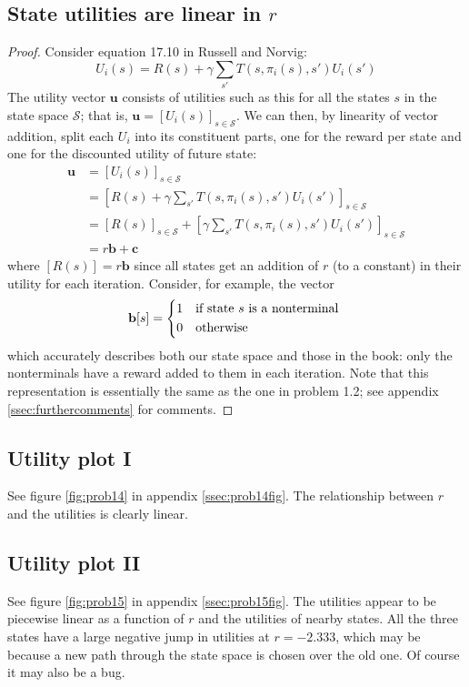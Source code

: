 \documentclass[letterpaper, 10pt]{article}
\begin{document}
\begin{multicols*}{2}
\subsection{State utilities are linear in $r$}
\begin{proof}
Consider equation 17.10 in Russell and Norvig:
\[ U_i(s) = R(s) + \gamma \sum_{s'} T(s, \pi_i(s), s') U_i(s') \]
The utility vector $\mathbf{u}$ consists of utilities such as this for all the states $s$ in the state space $\mathcal{S}$; that is, $\mathbf{u} = [U_i(s)]_{s \in \mathcal{S}}$.
We can then, by linearity of vector addition, split each $U_i$ into its constituent parts, one for the reward per state and one for the discounted utility of future state:
\begin{align*}
\mathbf{u} &= [U_i(s)]_{s \in \mathcal{S}} \\
&= \left[ R(s) + \gamma \sum_{s'} T(s, \pi_i(s), s') U_i(s') \right]_{s \in \mathcal{S}} \\
&= [R(s)]_{s \in \mathcal{S}} + \left[ \gamma \sum_{s'} T(s, \pi_i(s), s') U_i(s') \right]_{s \in \mathcal{S}} \\
&= r\mathbf{b} + \mathbf{c}
\end{align*}
where $[R(s)] = r\mathbf{b}$ since all states get an addition of $r$ (to a constant) in their utility for each iteration.
Consider, for example, the vector
\[
\mathbf{b}[s] = \begin{dcases*}
1 & if state $s$ is a nonterminal \\
0 & otherwise
\end{dcases*}
\]
which accurately describes both our state space and those in the book: only the nonterminals have a reward added to them in each iteration.
Note that this representation is essentially the same as the one in problem 1.2; see appendix \ref{ssec:furthercomments} for comments.
\end{proof}

\subsection{Utility plot I}
See figure \ref{fig:prob14} in appendix \ref{ssec:prob14fig}. The relationship between $r$ and the utilities is clearly linear.

\subsection{Utility plot II}
See figure \ref{fig:prob15} in appendix \ref{ssec:prob15fig}. 
The utilities appear to be piecewise linear as a function of $r$ and the utilities of nearby states. 
All the three states have a large negative jump in utilities at $r = -2.333$, which may be because a new path through the state space is chosen over the old one.
Of course it may also be a bug.


\end{multicols*}
\end{document}
